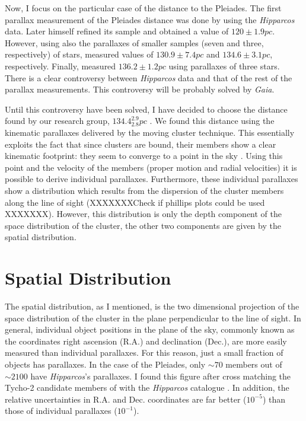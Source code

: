 Now, I focus on the particular case of the distance to the Pleiades. The first parallax measurement of the Pleiades distance was done by \citet{1999A&A...341L..71V} using the \emph{Hipparcos} data. Later himself \citep{2009A&A...497..209V} refined its sample and obtained a value of $120\pm1.9pc$. However, \citet{2000ApJ...533..938G, 2005AJ....129.1616S} using also the parallaxes of smaller samples (seven and three, respectively) of stars, measured values of $130.9\pm7.4pc$ and $134.6\pm3.1pc$, respectively. Finally, \citet{2014Sci...345.1029M} measured $136.2\pm1.2pc$ using parallaxes of three stars. There is a clear controversy between \emph{Hipparcos} data and that of the rest of the parallax measurements. This controversy will be probably solved by \emph{Gaia}. 

Until this controversy have been solved, I have decided to choose the distance found by our research group, $134.4^{2.9}_{2.8}pc$ \citep{Galli2017}. We found this distance using the kinematic parallaxes delivered by the moving cluster technique. This essentially exploits the fact that since clusters are bound, their members show a clear kinematic footprint: they seem to converge to a point in the sky \citep{1964IAUS...20...50B}. Using this point and the velocity of the members (proper motion and radial velocities) it is possible to derive individual parallaxes. Furthermore, these individual parallaxes show a distribution which results from the dispersion of the cluster members along the line of sight (XXXXXXXCheck if phillips plots could be used XXXXXXX). However, this distribution is only the depth component of the space distribution of the cluster, the other two components are given by the spatial distribution. 

\section{Spatial Distribution}
The spatial distribution, as I mentioned, is the two dimensional projection of the space distribution of the cluster in the plane perpendicular to the line of sight. In general, individual object positions in the plane of the sky, commonly known as the coordinates right ascension (R.A.) and declination (Dec.), are more easily measured than individual parallaxes. For this reason, just a small fraction of objects has parallaxes. In the case of the Pleiades, only $\sim70$ members out of $\sim2100$ have \emph{Hipparcos}'s parallaxes. I found this figure after cross matching the Tycho-2 candidate members of \citet{Bouy2015} with the \emph{Hipparcos} catalogue \citep{1997A&A...323L..49P} . In addition, the relative uncertainties in R.A. and Dec. coordinates are far better ($10^{-5}$) than those of individual parallaxes ($10^{-1}$).

